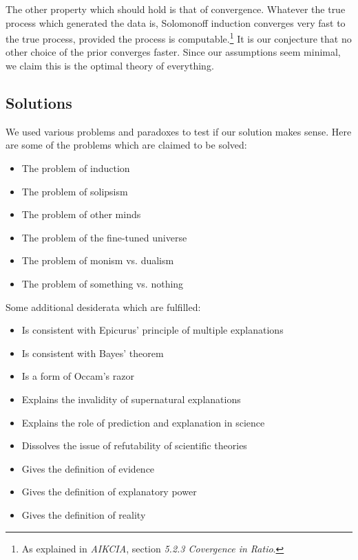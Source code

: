 The other property which should hold is that of convergence.
Whatever the true process which generated the data is, Solomonoff induction converges very fast to the true process, provided the process is computable.\footnote{As explained in \textit{AIKCIA}, section \textit{5.2.3 Covergence in Ratio}.}
It is our conjecture that no other choice of the prior converges faster.
Since our assumptions seem minimal, we claim this is the optimal theory of everything.

\newpage

\subsection{Solutions}

We used various problems and paradoxes to test if our solution makes sense. Here are some of the problems which are claimed to be solved:

\begin{itemize}
\item The problem of induction
\item The problem of solipsism
\item The problem of other minds
\item The problem of the fine-tuned universe
\item The problem of monism vs. dualism
\item The problem of something vs. nothing
\end{itemize}

\noindent
Some additional desiderata which are fulfilled:

\begin{itemize}
\item Is consistent with Epicurus' principle of multiple explanations
\item Is consistent with Bayes' theorem
\item Is a form of Occam's razor
\item Explains the invalidity of supernatural explanations
\item Explains the role of prediction and explanation in science
\item Dissolves the issue of refutability of scientific theories
\item Gives the definition of evidence
\item Gives the definition of explanatory power
\item Gives the definition of reality
\end{itemize}

